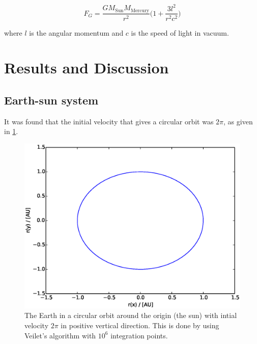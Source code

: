 \documentclass{article}
\begin{document}
$$F_G=\frac{GM_{\mathrm{Sun}}M_{\mathrm{Mercury}}}{r^2}\bigg( 1+\frac{3l^2}{r^2c^2}\bigg)$$

where $l$ is the angular momentum and $c$ is the speed of light in vacuum.


\section{Results and Discussion}

\subsection{Earth-sun system}
It was found that the initial velocity that gives a circular orbit was $2\pi$, as given in \ref{jordensbane}.
\begin{figure}[H]
  \includegraphics[scale=0.6]{plots/3c_jordensbane_verlet_n10e6.eps}
  \caption{The Earth in a circular orbit around the origin (the sun) with intial velocity $2\pi$ in positive vertical direction. This is done by using Veilet's algorithm with $10^6$ integration points.}
  \label{jordensbane}
\end{figure}
\end{document}
